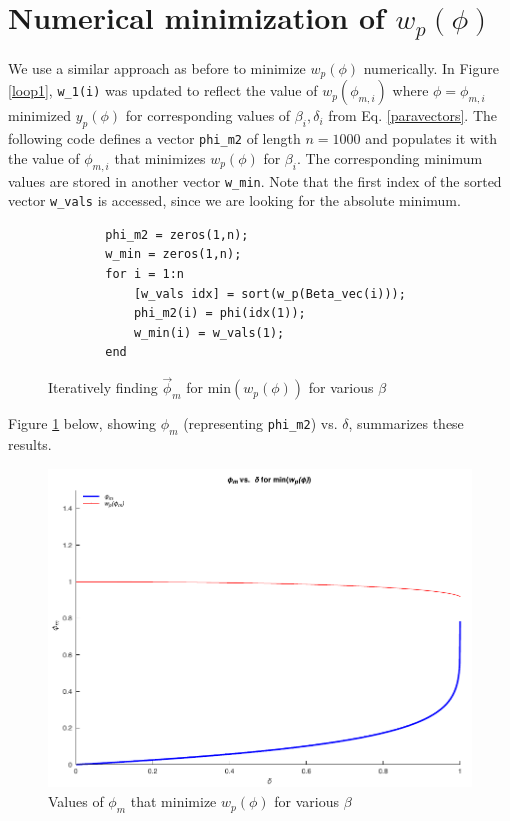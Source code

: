 \documentclass[11pt]{article}
\begin{document}
\section{Numerical minimization of \texorpdfstring{$w_p(\phi)$}{}}

We use a similar approach as before to minimize $w_p(\phi)$ numerically. 
In Figure \ref{loop1}, \verb|w_1(i)| was updated
to reflect the value of $w_p(\phi_{m,i})$ where $\phi=\phi_{m,i}$ minimized $y_p(\phi)$ for corresponding values of $\beta_i,\delta_i$
from Eq. \ref{paravectors}. The following code defines a vector \verb|phi_m2| of length $n=1000$ and populates it with the value of $\phi_{m,i}$ that minimizes $w_p(\phi)$ for $\beta_i$.
The corresponding minimum values are stored in another vector \verb|w_min|. Note that the first index of the sorted vector \verb|w_vals| is accessed, since we are looking for the absolute minimum.

\begin{figure}[H]
    \begin{verbatim}
        phi_m2 = zeros(1,n);
        w_min = zeros(1,n);
        for i = 1:n
            [w_vals idx] = sort(w_p(Beta_vec(i)));
            phi_m2(i) = phi(idx(1));
            w_min(i) = w_vals(1);
        end
    \end{verbatim}
    \caption{Iteratively finding $\vec\phi_m$ for $\mathrm{min}(w_p(\phi))$ for various $\beta$}
\end{figure}

Figure \ref{wminplot} below, showing $\phi_m$ (representing \verb|phi_m2|) vs. $\delta$, summarizes these results.

\begin{figure}[H]
    \includegraphics{plots/phi_delta_min.pdf}
    \caption{Values of $\phi_m$ that minimize $w_p(\phi)$ for various $\beta$}\label{wminplot}
\end{figure}

\end{document}
